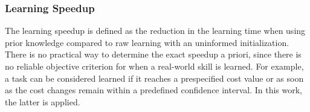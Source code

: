 \subsubsection{Learning Speedup}
The learning speedup is defined as the reduction in the learning time when using prior knowledge compared to raw learning with an uninformed initialization.
There is no practical way to determine the exact speedup a priori, since there is no reliable objective criterion for when a real-world skill is learned.
For example, a task can be considered learned if it reaches a prespecified cost value or as soon as the cost changes remain within a predefined confidence interval.
In this work, the latter is applied.